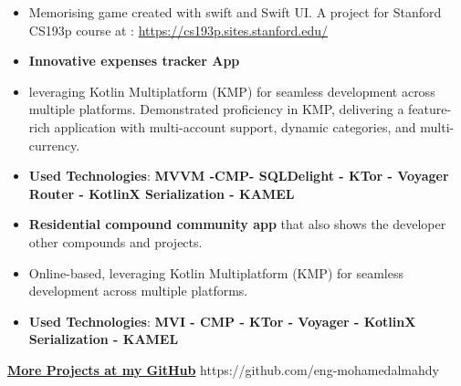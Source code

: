 \documentclass[10pt,a4paper,ragged2e,withhyper]{altacv}
\begin{document}
\begin{itemize}
\item \textbf{} Memorising game created with swift and Swift UI. \linebreak
A project for Stanford CS193p course at : \href{https://cs193p.sites.stanford.edu/}{https://cs193p.sites.stanford.edu/}
\end{itemize}
\divider


\vspace{6px}
\vspace{2px}

\begin{itemize}
\item \textbf{Innovative expenses tracker App}
\item leveraging Kotlin Multiplatform (KMP) for seamless development across multiple platforms.
Demonstrated proficiency in KMP,
delivering a feature-rich application with multi-account support, dynamic categories, and multi-currency.
\item \textbf{Used Technologies}: \textbf{MVVM -CMP- SQLDelight - KTor - Voyager Router - KotlinX Serialization - KAMEL}
\end{itemize}
\divider


\hypertarget{ion}{}
\begin{itemize}
\item \textbf{Residential compound community app} that also shows the developer other compounds and projects.
\item Online-based, leveraging Kotlin Multiplatform (KMP) for seamless development across multiple platforms.
\item \textbf{Used Technologies}: \textbf{MVI - CMP - KTor - Voyager - KotlinX Serialization - KAMEL}
\end{itemize}
\divider

\begin{center}
\textbf{\Large \href{https://github.com/eng-mohamedalmahdy}{More Projects at my GitHub}}
{\cvrepo{\color{GitHubColor}\faGithub}
{https://github.com/eng-mohamedalmahdy}}{}{}
\end{center}
\divider
\end{document}
